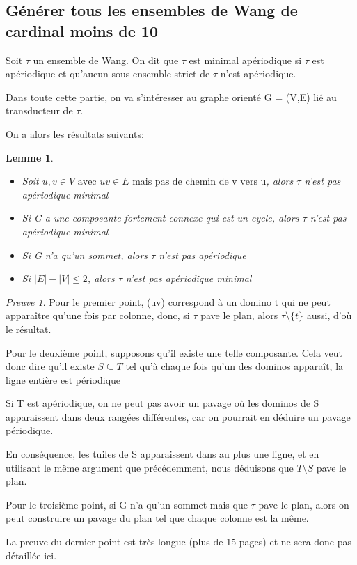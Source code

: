 \documentclass{scrartcl}
\renewcommand{\le}{\leqslant}
\newcommand{\sube}{\subseteq}
\newtheorem{lemme}{Lemme}
\theoremstyle{definition}
\theoremstyle{remark}
\newtheorem*{preuve}{Preuve}
\begin{document}
\subsection{Générer tous les ensembles de Wang de cardinal moins de 10}

Soit $\tau$ un ensemble de Wang. On dit que $\tau$ est minimal apériodique si $\tau$ est apériodique
et qu'aucun sous-ensemble strict de $\tau$ n'est apériodique.

\;

Dans toute cette partie, on va s'intéresser au graphe orienté G = (V,E) lié au transducteur de $\tau$.

On a alors les résultats suivants:

\begin{lemme}

\begin{itemize}
    \item Soit $u,v \in V \text{ avec } uv \in E \text{ mais pas de chemin de v vers u}$, alors $\tau$ n'est pas apériodique minimal
    \item Si G a une composante fortement connexe qui est un cycle, alors $\tau$ n'est pas apériodique minimal
    \item Si G n'a qu'un sommet, alors $\tau$ n'est pas apériodique
    \item Si $|E|-|V| \le 2$, alors $\tau$ n'est pas apériodique minimal
\end{itemize}

\end{lemme}

\begin{preuve}
    
Pour le premier point, (uv) correspond à un domino t qui ne peut apparaître qu'une fois par colonne,
donc, si $\tau$ pave le plan, alors $\tau \setminus \{t \}$ aussi, d'où le résultat.

\;

Pour le deuxième point, supposons qu'il existe une telle composante. Cela veut donc dire qu'il existe $S \sube T$
tel qu'à chaque fois qu'un des dominos apparaît, la ligne entière est périodique

Si T est apériodique, on ne peut pas avoir un pavage où les dominos de S apparaissent dans deux rangées différentes, car on pourrait en déduire un pavage périodique.

En conséquence, les tuiles de S apparaissent dans au plus une ligne, et en utilisant le même argument que précédemment, nous déduisons que $T \setminus S$ pave le plan.

\;

Pour le troisième point, si G n'a qu'un sommet mais que $\tau$ pave le plan, alors on peut construire un pavage
du plan tel que chaque colonne est la même.

\;

La preuve du dernier point est très longue (plus de 15 pages) et ne sera donc pas détaillée ici.

\end{preuve}
\end{document}
